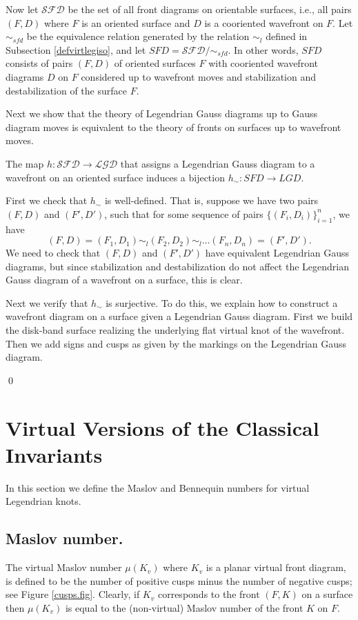 Now let $\mathcal{SFD}$ be the set of all front diagrams on orientable surfaces, i.e., all pairs $(F,D)$ where $F$  is an oriented surface and $D$ is a cooriented wavefront on $F$.  Let $\sim_{sfd}$ be the equivalence relation generated by the relation $\sim_l$ defined in Subsection \ref{defvirtlegiso}, and let $SFD=\mathcal{SFD}/\sim_{sfd}$.  In other words, $SFD$ consists of pairs $(F,D)$ of oriented surfaces $F$ with cooriented wavefront diagrams $D$ on $F$ considered up to wavefront moves and stabilization and destabilization of the surface $F$.

Next we show that the theory of Legendrian Gauss diagrams up to Gauss diagram moves is equivalent to the theory of fronts on surfaces up to wavefront moves.
\begin{thm} The map $h: \mathcal{SFD}\rightarrow \mathcal{LGD}$ that assigns a Legendrian Gauss diagram to a wavefront on an oriented surface induces a bijection $h_\sim : SFD \rightarrow LGD$.
\end{thm}
\pp  First we check that $h_\sim$ is well-defined.  That is, suppose we have two pairs $(F,D)$ and $(F', D')$, such that for some sequence of pairs $\{(F_i,D_i)\}_{i=1}^n$, we have
$$(F,D)=(F_1,D_1)\sim_l (F_2,D_2)\sim_l \dots (F_n, D_n)=(F',D').$$
We need to check that $(F,D)$ and $(F',D')$ have equivalent Legendrian Gauss diagrams, but since stabilization and destabilization do not affect the Legendrian Gauss diagram of a wavefront on a surface, this is clear.

Next we verify that $h_\sim$ is surjective.  To do this, we explain how to construct a wavefront diagram on a surface given a Legendrian Gauss diagram.   First we build the disk-band surface realizing the underlying flat virtual knot of the wavefront.  Then we add signs and cusps as given by the markings on the Legendrian Gauss diagram.

\qed

\section{Virtual Versions of the Classical Invariants}\label{classical.sec}

In this section we define the Maslov and Bennequin numbers for virtual Legendrian knots.

\subsection{Maslov number.}   The virtual Maslov number $\mu(K_v)$ where $K_v$ is a planar virtual front diagram, is defined to be the number of positive cusps minus the number of negative cusps; see Figure \ref{cusps.fig}.  Clearly, if $K_v$ corresponds to the front $(F,K)$ on a surface then $\mu(K_v)$ is equal to the (non-virtual) Maslov number of the front $K$ on $F$.

